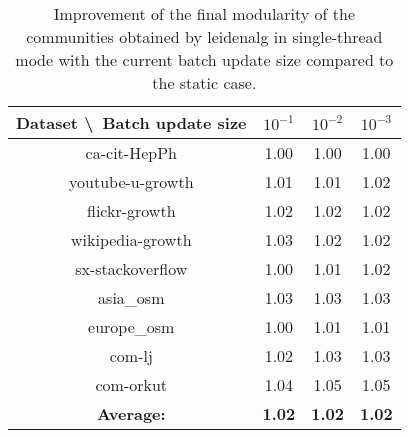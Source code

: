 \begin{table}[H]
	\centering
	\begin{tabular}{|c|c|c|c|}
		\hline
		Dataset \textbackslash\ Batch update size& $10^{-1}$ & $10^{-2}$ & $10^{-3}$ \\
		\hline
		ca-cit-HepPh & 1.00 & 1.00 & 1.00 \\
		\hline
		youtube-u-growth & 1.01 & 1.01 & 1.02 \\
		\hline
		flickr-growth & 1.02 & 1.02 & 1.02 \\
		\hline
		wikipedia-growth & 1.03 & 1.02 & 1.02 \\
		\hline
		sx-stackoverflow & 1.00 & 1.01 & 1.02 \\
		\hline
		asia\_osm & 1.03 & 1.03 & 1.03 \\
		\hline
		europe\_osm & 1.00 & 1.01 & 1.01 \\
		\hline
		com-lj & 1.02 & 1.03 & 1.03 \\
		\hline
		com-orkut & 1.04 & 1.05 & 1.05 \\
		\hline
		\textbf{Average:} & \textbf{1.02} & \textbf{1.02} & \textbf{1.02} \\
		\hline
	\end{tabular}
\caption{Improvement of the final modularity of the communities obtained by leidenalg in single-thread mode with the current batch update size compared to the static case.}
\label{T:modularity speedup for leidenalg}
\end{table}